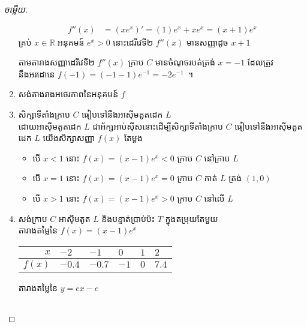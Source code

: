 \documentclass[a5paper,10pt,fleqn]{article}
\begin{document}
\begin{proof}[ចម្លើយ]
\begin{enumerate}
\begin{align*}
			f''(x)
				&=(xe^x)'
				=(1)e^x+xe^x
				=(x+1)e^x
		\end{align*}
		គ្រប់ $ x\in\mathbb{R} $ អនុគមន៍ $ e^x>0 $ នោះដេរីវេទី២ $ f''(x) $ មានសញ្ញាដូច $ x+1 $
		\begin{table}[H]
			\centering
		\end{table}
		តាមតារាងសញ្ញាដេរីវេទី២ $ f''(x) $ ក្រាប $ C $ មានចំណុចរបត់ត្រង់ $ x=-1 $ ដែលត្រូវនឹងអរដោនេ $ f(-1)=(-1-1)e^{-1}=-2e^{-1} $~។
		\item សង់តាងរាងអថេរភាពនៃអនុគមន៍ $ f $
		\begin{table}[H]
			\centering
		\end{table}
		\item សិក្សាទីតាំងក្រាប $ C $ ធៀបទៅនឹងអាស៊ីមតូតដេក $ L $\\
		ដោយអាស៊ីមតូតដេក $ L $ ជាអ័ក្សអាប់ស៊ីសនោះដើម្បីសិក្សាទីតាំងក្រាប $ C $ ធៀបទៅនឹងអាស៊ីមតូតដេក $ L $ យើងសិក្សាសញ្ញា $ f(x) $ តែម្ដង
		\begin{itemize}
			\item បើ $ x<1 $ នោះ $ f(x)=(x-1)e^x<0 $ ក្រាប $ C $ នៅក្រាប $ L $
			\item បើ $ x=1 $ នោះ $ f(x)=(x-1)e^x=0 $ ក្រាប $ C $ កាត់ $ L $ ត្រង់ $ (1,0) $
			\item បើ $ x>1 $ នោះ $ f(x)=(x-1)e^x>0 $ ក្រាប $ C $ នៅលើ $ L $
		\end{itemize}
		\item សង់ក្រាប $ C $ អាស៊ីមតូត $ L $ និងបន្ទាត់ប្រាប់ប៉ះ $ T $ ក្នុងតម្រុយតែមួយ\\
		តារាងតម្លៃនៃ $ f(x)=(x-1)e^x $
		\begin{table}[H]
			\centering
			\begin{tabular}{r|lllll}
				$ x $ & $ -2 $ & $ -1 $ & $ 0 $ & $ 1 $ & $ 2 $\\
				\hline
				$ f(x) $ & $ -0.4 $ & $ -0.7 $ & $ -1 $ & $ 0 $ & $ 7.4 $
			\end{tabular}
		\end{table}
		តារាងតម្លៃនៃ $ y=ex-e $
		\begin{table}[H]
			\centering
			\begin{tabular}{r|ll}

\end{tabular}
\end{table}
\end{enumerate}
\end{proof}
\end{document}

